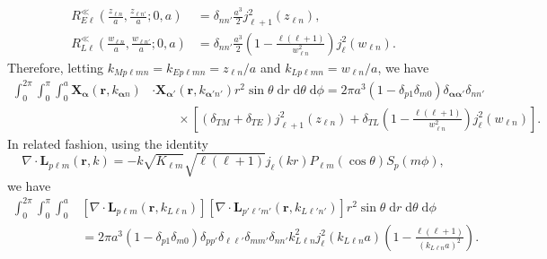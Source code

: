 \begin{equation}
\begin{split}
R_{E\ell}^\ll\left(\frac{z_{\ell n}}{a},\frac{z_{\ell n'}}{a};0,a\right) &= \delta_{nn'}\frac{a^3}{2}j_{\ell + 1}^2(z_{\ell n}),\\[0.5em]
R_{L\ell}^\ll\left(\frac{w_{\ell n}}{a},\frac{w_{\ell n'}}{a};0,a\right) &= \delta_{nn'}\frac{a^3}{2}\left(1 - \frac{\ell(\ell + 1)}{w_{\ell n}^2}\right)j_\ell^2(w_{\ell n}).
\end{split}
\end{equation}
Therefore, letting $k_{Mp\ell mn} = k_{Ep\ell mn} = z_{\ell n}/a$ and $k_{Lp\ell m n} = w_{\ell n}/a$, we have
\begin{equation}
\begin{split}
\int_0^{2\pi}\int_0^\pi\int_0^a\mathbf{X}_{\bm{\alpha}}(\mathbf{r},k_{\bm{\alpha}n})&\cdot\mathbf{X}_{\bm{\alpha}'}(\mathbf{r},k_{\bm{\alpha}'n'})r^2\sin\theta\;\mathrm{d}r\;\mathrm{d}\theta\;\mathrm{d}\phi = 2\pi a^3(1 - \delta_{p1}\delta_{m0})\delta_{\bm{\alpha}\bm{\alpha}'}\delta_{nn'}\\
&\qquad\times\left[(\delta_{TM} + \delta_{TE})j_{\ell + 1}^2(z_{\ell n}) + \delta_{TL}\left(1 - \frac{\ell(\ell + 1)}{w_{\ell n}^2}\right)j_{\ell}^2(w_{\ell n})\right].
\end{split}
\end{equation}
In related fashion, using the identity
\begin{equation}
\nabla\cdot\mathbf{L}_{p\ell m}(\mathbf{r},k) = -k\sqrt{K_{\ell m}}\sqrt{\ell(\ell + 1)}j_\ell(kr)P_{\ell m}(\cos\theta)S_p(m\phi),
\end{equation}
we have
\begin{equation}
\begin{split}
\int_0^{2\pi}\int_0^\pi\int_0^a&\left[\nabla\cdot\mathbf{L}_{p\ell m}(\mathbf{r},k_{L\ell n})\right]\left[\nabla\cdot\mathbf{L}_{p'\ell'm'}(\mathbf{r},k_{L\ell'n'})\right]r^2\sin\theta\;\mathrm{d}r\;\mathrm{d}\theta\;\mathrm{d}\phi\\
&= 2\pi a^3(1 - \delta_{p1}\delta_{m0})\delta_{pp'}\delta_{\ell\ell'}\delta_{mm'}\delta_{nn'}k_{L\ell n}^2j_\ell^2(k_{L\ell n}a)\left(1 - \frac{\ell(\ell + 1)}{(k_{L\ell n}a)^2}\right).
\end{split}
\end{equation}

